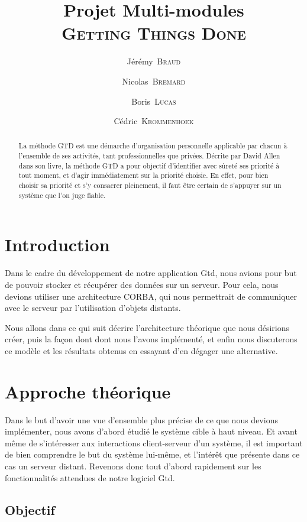 \documentclass[a4paper, french, 11pt]{report}
\author{Jérémy~\textsc{Braud} \and Nicolas~\textsc{Bremard} \and Boris~\textsc{Lucas} \and Cédric~\textsc{Krommenhoek}}
\title{Projet Multi-modules\\
	\huge{\textsc{Getting Things Done}}}
\begin{document}
\maketitle

\begin{abstract}
La méthode GTD est une démarche d'organisation personnelle applicable par chacun à l'ensemble de ses activités, tant professionnelles que privées. Décrite par David Allen dans son livre, la méthode GTD a pour objectif d'identifier avec sûreté ses priorité à tout moment, et d'agir immédiatement sur la priorité choisie. En effet, pour bien choisir sa priorité et s'y consacrer pleinement, il faut être certain de s'appuyer sur un système que l'on juge fiable.
\end{abstract}

\tableofcontents

\chapter*{Introduction}

Dans le cadre du développement de notre application Gtd, nous avions pour but de pouvoir stocker et récupérer des données sur un serveur. Pour cela, nous devions utiliser une architecture CORBA, qui nous permettrait de communiquer avec le serveur par l'utilisation d'objets distants.

Nous allons dans ce qui suit décrire l'architecture théorique que nous désirions créer, puis la façon dont dont nous l'avons implémenté, et enfin nous discuterons ce modèle et les résultats obtenus en essayant d'en dégager une alternative.
	
\chapter{Approche théorique}

\minitoc

Dans le but d'avoir une vue d'ensemble plus précise de ce que nous devions implémenter, nous avons d'abord étudié le système cible à haut niveau. Et avant même de s'intéresser aux interactions client-serveur d'un système, il est important de bien comprendre le but du système lui-même, et l'intérêt que présente dans ce cas un serveur distant.
Revenons donc tout d'abord rapidement sur les fonctionnalités attendues de notre logiciel Gtd.

\section{Objectif}
\end{document}
